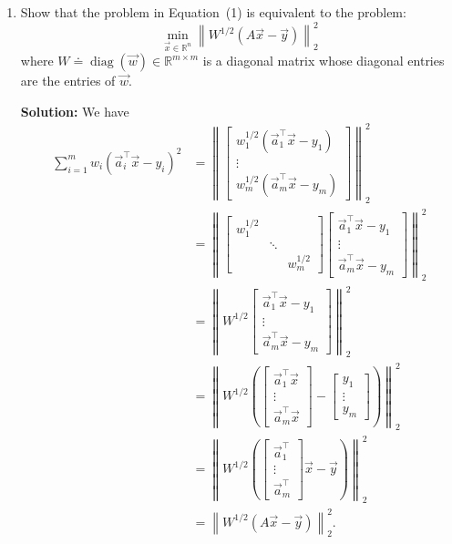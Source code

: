 \documentclass[10pt]{article}
\newcommand{\RR}{\mathbb{R}}
\begin{document}
\begin{enumerate}[label=(\alph*)]
    \item Show that the problem in Equation~(1) is equivalent to the problem:
    \begin{equation}
        \min_{\vec{x} \in \RR^n} \left\| W^{1/2}(A\vec{x} - \vec{y}) \right\|_2^2
    \end{equation}
    where $W \doteq \operatorname{diag}(\vec{w}) \in \RR^{m \times m}$ is a diagonal matrix whose diagonal entries are the entries of $\vec{w}$.

    \textbf{Solution:} We have
    \begin{align}
        \sum_{i=1}^{m} w_i (\vec{a}_i^\top \vec{x} - y_i)^2
        &= \left\| \begin{bmatrix} w_1^{1/2}(\vec{a}_1^\top \vec{x} - y_1) \\ \vdots \\ w_m^{1/2}(\vec{a}_m^\top \vec{x} - y_m) \end{bmatrix} \right\|_2^2 \\
        &= \left\| \begin{bmatrix} w_1^{1/2} & & \\ & \ddots & \\ & & w_m^{1/2} \end{bmatrix} \begin{bmatrix} \vec{a}_1^\top \vec{x} - y_1 \\ \vdots \\ \vec{a}_m^\top \vec{x} - y_m \end{bmatrix} \right\|_2^2 \\
        &= \left\| W^{1/2} \begin{bmatrix} \vec{a}_1^\top \vec{x} - y_1 \\ \vdots \\ \vec{a}_m^\top \vec{x} - y_m \end{bmatrix} \right\|_2^2 \\
        &= \left\| W^{1/2} \left( \begin{bmatrix} \vec{a}_1^\top \vec{x} \\ \vdots \\ \vec{a}_m^\top \vec{x} \end{bmatrix} - \begin{bmatrix} y_1 \\ \vdots \\ y_m \end{bmatrix} \right) \right\|_2^2 \\
        &= \left\| W^{1/2} \left( \begin{bmatrix} \vec{a}_1^\top \\ \vdots \\ \vec{a}_m^\top \end{bmatrix} \vec{x} - \vec{y} \right) \right\|_2^2 \\
        &= \left\| W^{1/2}(A\vec{x} - \vec{y}) \right\|_2^2.
    \end{align}


\end{enumerate}
\end{document}
